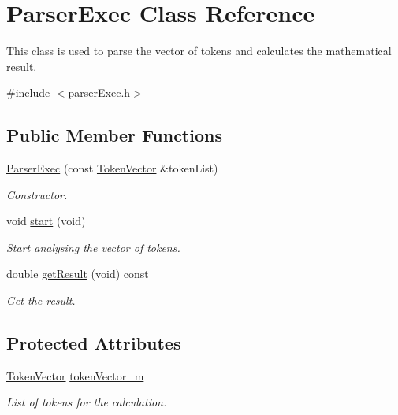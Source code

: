 \hypertarget{class_parser_exec}{}\section{Parser\+Exec Class Reference}
\label{class_parser_exec}


This class is used to parse the vector of tokens and calculates the mathematical result.  




{\ttfamily \#include $<$parser\+Exec.\+h$>$}

\subsection*{Public Member Functions}
\begin{DoxyCompactItemize}
\item 
\hyperlink{class_parser_exec_a865378c0f6a301dd4bffd870512167e2}{Parser\+Exec} (const \hyperlink{token_8h_ab47f31774188c3fad94acfd21e12c917}{Token\+Vector} \&token\+List)
\begin{DoxyCompactList}\small\item\em Constructor. \end{DoxyCompactList}\item 
\hypertarget{class_parser_exec_aa00f3c5f1f4ea46e1c6aafebff8d4e9f}{}void \hyperlink{class_parser_exec_aa00f3c5f1f4ea46e1c6aafebff8d4e9f}{start} (void)\label{class_parser_exec_aa00f3c5f1f4ea46e1c6aafebff8d4e9f}

\begin{DoxyCompactList}\small\item\em Start analysing the vector of tokens. \end{DoxyCompactList}\item 
double \hyperlink{class_parser_exec_a795310e370db53f50dd44522568409fb}{get\+Result} (void) const 
\begin{DoxyCompactList}\small\item\em Get the result. \end{DoxyCompactList}\end{DoxyCompactItemize}
\subsection*{Protected Attributes}
\begin{DoxyCompactItemize}
\item 
\hypertarget{class_parser_exec_a56bfa666d473614fa26a484036897183}{}\hyperlink{token_8h_ab47f31774188c3fad94acfd21e12c917}{Token\+Vector} \hyperlink{class_parser_exec_a56bfa666d473614fa26a484036897183}{token\+Vector\+\_\+m}\label{class_parser_exec_a56bfa666d473614fa26a484036897183}

\begin{DoxyCompactList}\small\item\em List of tokens for the calculation. \end{DoxyCompactList}\end{DoxyCompactItemize}


